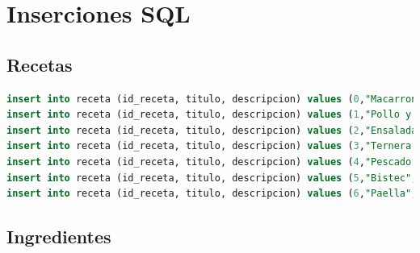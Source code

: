 \documentclass[12pt,letterpaper]{article}
\begin{document}
\section{Inserciones SQL}

\subsection{Recetas}

\begin{lstlisting}[language=sql]
insert into receta (id_receta, titulo, descripcion) values (0,"Macarrones","Macarrones con tomate y queso rayado");
insert into receta (id_receta, titulo, descripcion) values (1,"Pollo y verdura","Filetes de pollo con menestra de verduras");
insert into receta (id_receta, titulo, descripcion) values (2,"Ensalada mixta","Tomate, lechuga, atun, esparragos blancos y zanahoria.");
insert into receta (id_receta, titulo, descripcion) values (3,"Ternera y habas","Escalope de ternera con habas salteadas");
insert into receta (id_receta, titulo, descripcion) values (4,"Pescado al limon","Pescado, limon, sal, ajo y aceite");
insert into receta (id_receta, titulo, descripcion) values (5,"Bistec","Cebolla, bistec, oregano, aceite");
insert into receta (id_receta, titulo, descripcion) values (6,"Paella","Arroz, calamares, pollo, mejillones, gambas");
\end{lstlisting}

\subsection {Ingredientes}
\end{document}

